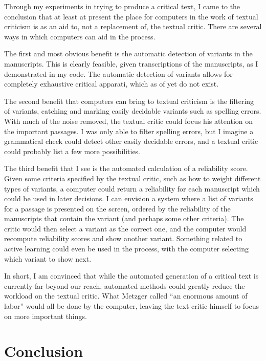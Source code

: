 \documentclass[onecolumn, 12pt]{article}
\begin{document}
Through my experiments in trying to produce a critical text, I came to the
conclusion that at least at present the place for computers in the work of
textual criticism is as an aid to, not a replacement of, the textual critic.
There are several ways in which computers can aid in the process.

The first and most obvious benefit is the automatic detection of variants in
the manuscripts.  This is clearly feasible, given transcriptions of the
manuscripts, as I demonstrated in my code.  The automatic detection of variants
allows for completely exhaustive critical apparati, which as of yet do not
exist.

The second benefit that computers can bring to textual criticism is the
filtering of variants, catching and marking easily decidable variants such as
spelling errors.  With much of the noise removed, the textual critic could
focus his attention on the important passages.  I was only able to filter
spelling errors, but I imagine a grammatical check could detect other easily
decidable errors, and a textual critic could probably list a few more
possibilities.

The third benefit that I see is the automated calculation of a reliability
score.  Given some criteria specified by the textual critic, such as how to
weight different types of variants, a computer could return a reliability for
each manuscript which could be used in later decisions.  I can envision a
system where a list of variants for a passage is presented on the screen,
ordered by the reliability of the manuscripts that contain the variant (and
perhaps some other criteria).  The critic would then select a variant as the
correct one, and the computer would recompute reliability scores and show
another variant.  Something related to active learning could even be used in
the process, with the computer selecting which variant to show next.

In short, I am convinced that while the automated generation of a critical text
is currently far beyond our reach, automated methods could greatly reduce the
workload on the textual critic.  What Metzger called ``an enormous amount of
labor'' would all be done by the computer, leaving the text critic himself to
focus on more important things.

\section{Conclusion}
\label{sec:conclusion}
\end{document}
